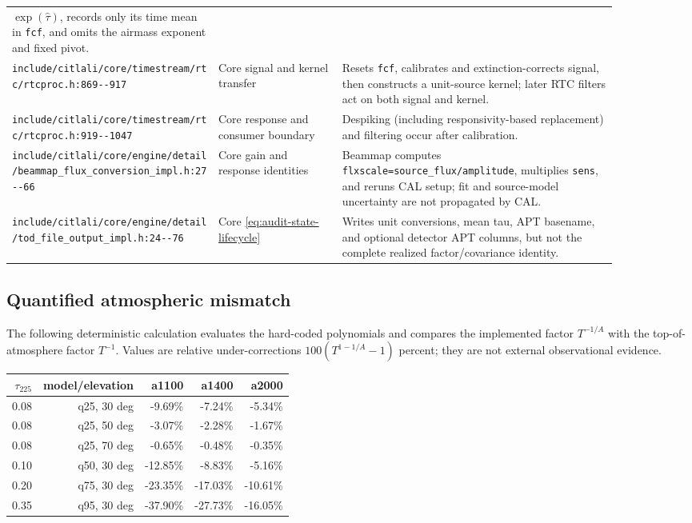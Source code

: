\documentclass[11pt]{article}
\newcommand{\code}[1]{\nolinkurl{#1}}
\begin{document}
\begin{longtable}{L{0.30\linewidth}L{0.18\linewidth}L{0.40\linewidth}}
\(\exp(\widehat\tau)\), records only its time mean in \code{fcf}, and omits
the airmass exponent and fixed pivot.\\
\code{include/citlali/core/timestream/rtc/rtcproc.h:869--917} & Core signal and
kernel transfer & Resets \code{fcf},
calibrates and extinction-corrects signal, then constructs a unit-source
kernel; later RTC filters act on both signal and kernel.\\
\code{include/citlali/core/timestream/rtc/rtcproc.h:919--1047} & Core response
and consumer boundary & Despiking (including responsivity-based replacement)
and filtering occur after calibration.\\
\code{include/citlali/core/engine/detail/beammap_flux_conversion_impl.h:27--66} &
Core gain and response identities & Beammap computes
\code{flxscale=source_flux/amplitude}, multiplies \code{sens}, and reruns CAL
setup; fit and source-model uncertainty are not propagated by CAL.\\
\code{include/citlali/core/engine/detail/tod_file_output_impl.h:24--76} & Core
\eqref{eq:audit-state-lifecycle} & Writes unit conversions, mean tau, APT
basename, and optional detector APT columns, but not the complete realized
factor/covariance identity.\\
\bottomrule
\end{longtable}

\subsection{Quantified atmospheric mismatch}

The following deterministic calculation evaluates the hard-coded polynomials
and compares the implemented factor \(T^{-1/A}\) with the top-of-atmosphere
factor \(T^{-1}\).  Values are relative under-corrections
\(100(T^{1-1/A}-1)\) percent; they are not external observational evidence.

\begin{center}
\begin{tabular}{rrrrr}
\toprule
\(\tau_{225}\) & model/elevation & a1100 & a1400 & a2000\\
\midrule
0.08 & q25, 30 deg & -9.69\% & -7.24\% & -5.34\%\\
0.08 & q25, 50 deg & -3.07\% & -2.28\% & -1.67\%\\
0.08 & q25, 70 deg & -0.65\% & -0.48\% & -0.35\%\\
0.10 & q50, 30 deg & -12.85\% & -8.83\% & -5.16\%\\
0.20 & q75, 30 deg & -23.35\% & -17.03\% & -10.61\%\\
0.35 & q95, 30 deg & -37.90\% & -27.73\% & -16.05\%\\
\bottomrule
\end{tabular}
\end{center}
\end{document}

